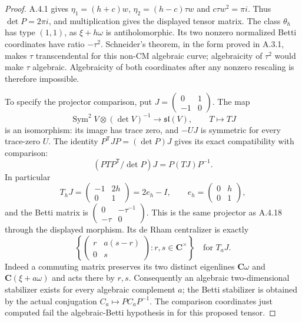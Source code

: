 \begin{proof}
A.4.1 gives
$\eta_1=(h+c)w$, $\eta_2=(h-c)\tau w$ and
$c\tau w^2=\pi i$. Thus $\det P=2\pi i$, and multiplication gives
the displayed tensor matrix. The class $\theta_h$ has type $(1,1)$,
as $\xi+h\omega$ is antiholomorphic. Its two nonzero normalized
Betti coordinates have ratio $-\tau^2$. Schneider's theorem,
in the form proved in A.3.1, makes $\tau$ transcendental for this
non-CM algebraic curve; algebraicity of $\tau^2$ would make $\tau$
algebraic. Algebraicity of both coordinates after any nonzero
rescaling is therefore impossible.

To specify the projector comparison, put
$J=\left(\begin{smallmatrix}0&1\\-1&0\end{smallmatrix}\right)$.
The map
\[
 \operatorname{Sym}^2 V\otimes(\det V)^{-1}
       \longrightarrow\mathfrak{sl}(V),\qquad T\longmapsto TJ
\]
is an isomorphism: its image has trace zero, and $-UJ$ is symmetric
for every trace-zero $U$. The identity
$P^{\mathsf T}JP=(\det P)J$ gives its exact compatibility with
comparison:
\[
 (PTP^{\mathsf T}/\det P)J=P(TJ)P^{-1}.
\]
In particular
\[
 T_hJ=\begin{pmatrix}-1&2h\\0&1\end{pmatrix}=2e_h-I,
 \qquad e_h=\begin{pmatrix}0&h\\0&1\end{pmatrix},
\]
and the Betti matrix is
$\left(\begin{smallmatrix}0&-\tau^{-1}\\-\tau&0\end{smallmatrix}\right)$.
This is the same projector as A.4.18 through the displayed morphism.
Its de Rham centralizer is exactly
\[
 \left\{\begin{pmatrix}r&a(s-r)\\0&s\end{pmatrix}:
                  r,s\in\mathbf C^\times\right\}
 \quad\text{for }T_aJ.
\]
Indeed a commuting matrix preserves its two distinct eigenlines
$\mathbf C\omega$ and $\mathbf C(\xi+a\omega)$ and acts there by
$r,s$. Consequently an algebraic two-dimensional stabilizer exists
for every algebraic complement $a$; the Betti stabilizer is obtained
by the actual conjugation $C_a\mapsto PC_aP^{-1}$.
The comparison coordinates just computed fail the algebraic-Betti
hypothesis in \cite[Definition 4.5, p.13; Theorem 7.12(ii), p.27 of
 the opened snapshot]{EllKSVAuthor45} for this proposed tensor.


\end{proof}
